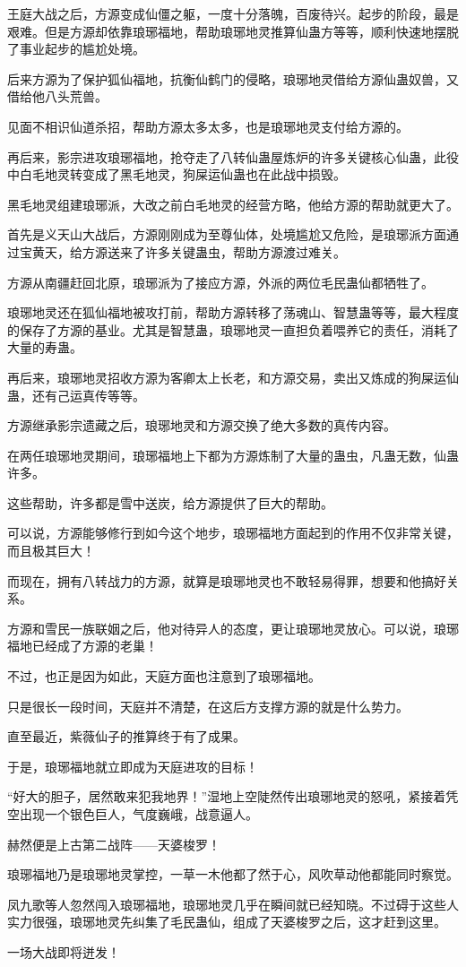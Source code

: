 \begin{this_body}
王庭大战之后，方源变成仙僵之躯，一度十分落魄，百废待兴。起步的阶段，最是艰难。但是方源却依靠琅琊福地，帮助琅琊地灵推算仙蛊方等等，顺利快速地摆脱了事业起步的尴尬处境。

后来方源为了保护狐仙福地，抗衡仙鹤门的侵略，琅琊地灵借给方源仙蛊奴兽，又借给他八头荒兽。

见面不相识仙道杀招，帮助方源太多太多，也是琅琊地灵支付给方源的。

再后来，影宗进攻琅琊福地，抢夺走了八转仙蛊屋炼炉的许多关键核心仙蛊，此役中白毛地灵转变成了黑毛地灵，狗屎运仙蛊也在此战中损毁。

黑毛地灵组建琅琊派，大改之前白毛地灵的经营方略，他给方源的帮助就更大了。

首先是义天山大战后，方源刚刚成为至尊仙体，处境尴尬又危险，是琅琊派方面通过宝黄天，给方源送来了许多关键蛊虫，帮助方源渡过难关。

方源从南疆赶回北原，琅琊派为了接应方源，外派的两位毛民蛊仙都牺牲了。

琅琊地灵还在狐仙福地被攻打前，帮助方源转移了荡魂山、智慧蛊等等，最大程度的保存了方源的基业。尤其是智慧蛊，琅琊地灵一直担负着喂养它的责任，消耗了大量的寿蛊。

再后来，琅琊地灵招收方源为客卿太上长老，和方源交易，卖出又炼成的狗屎运仙蛊，还有己运真传等等。

方源继承影宗遗藏之后，琅琊地灵和方源交换了绝大多数的真传内容。

在两任琅琊地灵期间，琅琊福地上下都为方源炼制了大量的蛊虫，凡蛊无数，仙蛊许多。

这些帮助，许多都是雪中送炭，给方源提供了巨大的帮助。

可以说，方源能够修行到如今这个地步，琅琊福地方面起到的作用不仅非常关键，而且极其巨大！

而现在，拥有八转战力的方源，就算是琅琊地灵也不敢轻易得罪，想要和他搞好关系。

方源和雪民一族联姻之后，他对待异人的态度，更让琅琊地灵放心。可以说，琅琊福地已经成了方源的老巢！

不过，也正是因为如此，天庭方面也注意到了琅琊福地。

只是很长一段时间，天庭并不清楚，在这后方支撑方源的就是什么势力。

直至最近，紫薇仙子的推算终于有了成果。

于是，琅琊福地就立即成为天庭进攻的目标！

“好大的胆子，居然敢来犯我地界！”湿地上空陡然传出琅琊地灵的怒吼，紧接着凭空出现一个银色巨人，气度巍峨，战意逼人。

赫然便是上古第二战阵——天婆梭罗！

琅琊福地乃是琅琊地灵掌控，一草一木他都了然于心，风吹草动他都能同时察觉。

凤九歌等人忽然闯入琅琊福地，琅琊地灵几乎在瞬间就已经知晓。不过碍于这些人实力很强，琅琊地灵先纠集了毛民蛊仙，组成了天婆梭罗之后，这才赶到这里。

一场大战即将迸发！

\end{this_body}

